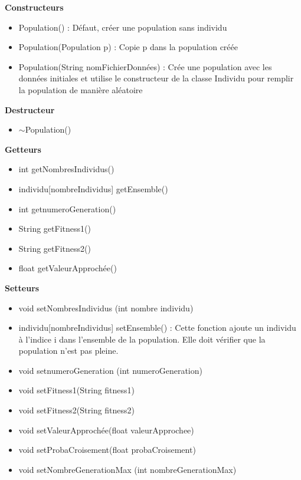 \documentclass[a4paper,11pt]{article}
\begin{document}
			\textbf{Constructeurs}
						\begin{itemize}
							\item Population() : Défaut, créer une population sans individu
							\item Population(Population p) : Copie p dans la population créée
							\item Population(String nomFichierDonnées) : Crée une population avec les données initiales et utilise le constructeur de la classe Individu pour remplir la population de manière aléatoire\\
						\end{itemize}
			\textbf{Destructeur}
					\begin{itemize}
							\item $\sim$Population()\\
					\end{itemize}
			\textbf{Getteurs}
					\begin{itemize}
							\item int getNombresIndividus()
							\item individu[nombreIndividus] getEnsemble()
							\item int getnumeroGeneration()
							\item String getFitness1()
							\item String getFitness2()
							\item float getValeurApprochée()\\
					\end{itemize}
			\textbf{Setteurs}
					\begin{itemize}
							\item void setNombresIndividus (int nombre individu)
							\item individu[nombreIndividus] setEnsemble() : Cette fonction ajoute un individu à l’indice i dans l’ensemble de la population.
																			Elle doit vérifier que la population n’est pas pleine.
							\item void setnumeroGeneration (int numeroGeneration)
							\item void setFitness1(String fitness1)
							\item void setFitness2(String fitness2)
							\item void setValeurApprochée(float valeurApprochee)
							\item void setProbaCroisement(float probaCroisement)
							\item void setNombreGenerationMax (int nombreGenerationMax)\\
					\end{itemize}
\end{document}
